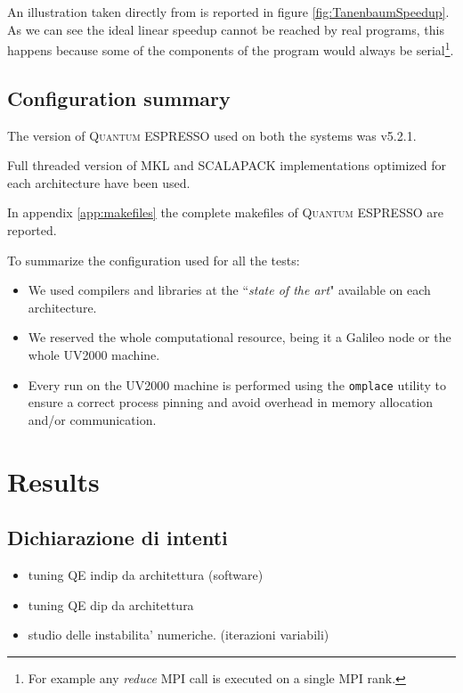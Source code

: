 \documentclass[a4paper,12pt]{article}
\newcommand\QE{\textsc{Quantum} ESPRESSO }
\begin{document}
An illustration taken directly from \cite{Tanenbaum} is reported in figure \ref{fig:TanenbaumSpeedup}.
As we can see the ideal linear speedup cannot be reached by real programs, this happens because some of the components of the program would always be serial\footnote{For example any \textit{reduce} MPI call is executed on a single MPI rank.}.

\subsection{Configuration summary}\label{sec:ConfSummary}

The version of \QE used on both the systems was v5.2.1.

Full threaded version of MKL and SCALAPACK implementations optimized for each architecture have been used.

In appendix \ref{app:makefiles} the complete makefiles of \QE are reported.

To summarize the configuration used for all the tests:
\begin{itemize}
	\item We used compilers and libraries at the ``\textit{state of the art}" available on each architecture.
	\item We reserved the whole computational resource, being it a Galileo node or the whole UV2000 machine.
	\item Every run on the UV2000 machine is performed using the \texttt{omplace} utility to ensure a correct process pinning and avoid overhead in memory allocation and/or communication.
\end{itemize}





\section{Results}
\subsection{Dichiarazione di intenti}\label{sec:dichiarazionePoetica}
\begin{itemize}
	\item tuning QE indip da architettura (software)
	\item tuning QE dip da architettura 
	\item studio delle instabilita' numeriche. (iterazioni variabili)
\end{itemize}
\end{document}
